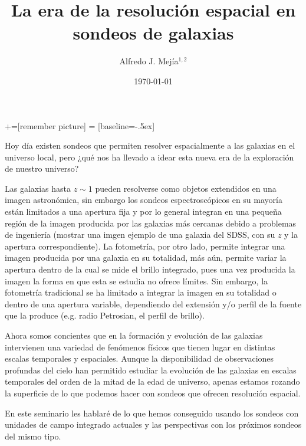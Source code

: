 \documentclass[xcolor=dvipsnames,4pt]{beamer}
\begin{document}
+=[remember picture]
 = [baseline=-.5ex]

\begin{frame}
\title{La era de la resolución espacial en sondeos de galaxias}
\author{Alfredo J. Mej\'ia$^{1,2}$}

\date{\today}


\maketitle
\end{frame}

\begin{frame}{}
%
Hoy día existen sondeos que permiten resolver espacialmente a las galaxias en el universo local,
pero ¿qué nos ha llevado a idear esta nueva era de la exploración de nuestro universo?

Las galaxias hasta $z\sim1$ pueden resolverse como objetos extendidos en una imagen astronómica, sin
embargo los sondeos espectroscópicos en su mayoría están limitados a una apertura fija y por lo
general integran en una pequeña región de la imagen producida por las galaxias más cercanas debido a
problemas de ingeniería (mostrar una imgen ejemplo de una galaxia del SDSS, con su $z$ y la apertura
correspondiente). La fotometría, por otro lado, permite integrar una imagen producida por una
galaxia en su totalidad, más aún, permite variar la apertura dentro de la cual se mide el brillo
integrado, pues una vez producida la imagen la forma en que esta se estudia no ofrece límites. Sin
embargo, la fotometría tradicional se ha limitado a integrar la imagen en su totalidad o dentro de
una apertura variable, dependiendo del extensión y/o perfil de la fuente que la produce (e.g. radio
Petrosian, el perfil de brillo).

Ahora somos concientes que en la formación y evolución de las galaxias intervienen una variedad de
fenómenos físicos que tienen lugar en distintas escalas temporales y espaciales. Aunque la
disponibilidad de observaciones profundas del cielo han permitido estudiar la evolución de las
galaxias en escalas temporales del orden de la mitad de la edad de universo, apenas estamos rozando
la superficie de lo que podemos hacer con sondeos que ofrecen resolución espacial.

En este seminario les hablaré de lo que hemos conseguido usando los sondeos con unidades de campo
integrado actuales y las perspectivas con los próximos sondeos del mismo tipo.
%
\end{frame}
\end{document}
